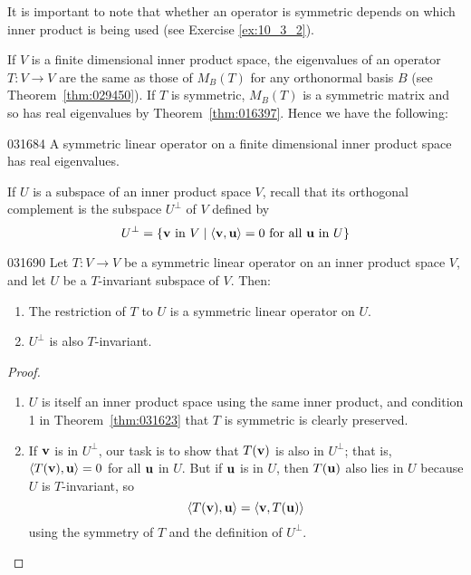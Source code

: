 It is important to note that whether an operator is symmetric depends on which inner product is being used (see Exercise \ref{ex:10_3_2}).

If $V$ is a finite dimensional inner product space, the eigenvalues of an operator $T : V \to V$ are the same as those of $M_{B}(T)$ for any orthonormal basis $B$ (see Theorem~\ref{thm:029450}). If $T$ is symmetric, $M_{B}(T)$ is a symmetric matrix and so has real eigenvalues by Theorem~\ref{thm:016397}. Hence we have the following:

\begin{theorem}{}{031684}
A symmetric linear operator on a finite dimensional inner product space has real eigenvalues.
\end{theorem}

If $U$ is a subspace of an inner product space $V$, recall that its orthogonal complement is the subspace $U^{\perp}$ of $V$ defined by
\begin{equation*}
U ^ \perp = \{\textbf{v} \mbox{ in } V \mid \langle \textbf{v}, \textbf{u} \rangle = 0 \mbox{ for all } \textbf{u} \mbox{ in } U \}
\end{equation*}
\begin{theorem}{}{031690}
Let $T : V \to V$ be a symmetric linear operator on an inner product space $V$, and let $U$ be a $T$-invariant subspace of $V$. Then:

\begin{enumerate}
\item The restriction of $T$ to $U$ is a symmetric linear operator on $U$.

\item $U^\perp$ is also $T$-invariant.

\end{enumerate}
\end{theorem}

\begin{proof}
\begin{enumerate}
\item $U$ is itself an inner product space using the same inner product, and condition 1 in Theorem~\ref{thm:031623} that $T$ is symmetric is clearly preserved.

\item If $\textbf{v}$ is in $U^{\perp}$, our task is to show that $T(\textbf{v})$ is also in $U^{\perp}$; that is, $\langle T(\textbf{v}), \textbf{u} \rangle = 0$ for all $\textbf{u}$ in $U$. But if $\textbf{u}$ is in $U$, then $T(\textbf{u})$ also lies in $U$ because $U$ is $T$-invariant, so
\begin{equation*}
\langle T(\textbf{v}), \textbf{u} \rangle = \langle \textbf{v}, T(\textbf{u}) \rangle
\end{equation*}
using the symmetry of $T$ and the definition of $U^{\perp}$.
\end{enumerate}
\vspace*{-2em}\end{proof}

